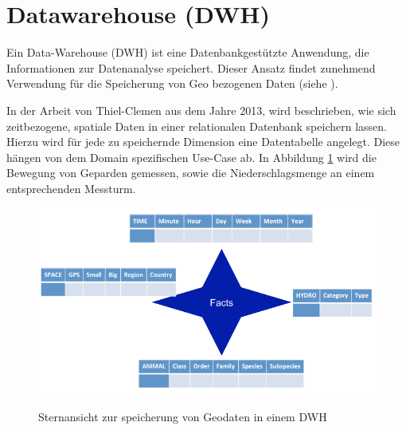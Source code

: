 \documentclass[10pt,conference,compsocconf]{IEEEtran}
\begin{document}
\section{Datawarehouse (DWH)}
Ein Data-Warehouse (DWH) ist eine Datenbankgestützte Anwendung, die Informationen zur Datenanalyse speichert. Dieser Ansatz findet zunehmend Verwendung für die Speicherung von Geo bezogenen Daten (siehe \cite{Kelling2009} \cite{McGuire2008} \cite{olap}).\par

In der Arbeit von Thiel-Clemen\cite{ThielClemen2013} aus dem Jahre 2013, wird beschrieben, wie sich zeitbezogene, spatiale Daten in einer relationalen Datenbank speichern lassen.\\
Hierzu wird für jede zu speichernde Dimension eine Datentabelle angelegt. Diese hängen von dem Domain spezifischen Use-Case ab. In Abbildung \ref{img:star_schema} wird die Bewegung von Geparden gemessen, sowie die Niederschlagsmenge an einem entsprechenden Messturm.

\begin{figure}[H]
  \centering
  	\includegraphics[width=\columnwidth]{img/star_schema}\\
  \caption[]{Sternansicht zur speicherung von Geodaten in einem DWH\cite{ThielClemen2013}}
  \label{img:star_schema}
\end{figure}
\end{document}
